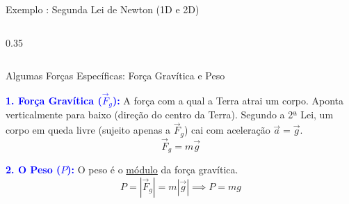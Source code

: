 \documentclass{beamer}
\begin{document}
\begin{frame}{Exemplo : Segunda Lei de Newton (1D e 2D)}
\begin{columns}[T]
\begin{column}{0.35\textwidth}
			\end{column}
		\end{columns}
		
	\end{frame}
	
	
	
	\begin{frame}{Algumas Forças Específicas: Força Gravítica e Peso}
		\footnotesize
		
		\textcolor{blue}{\textbf{1. Força Gravítica ($\vec{F}_g$):}} 		A força com a qual a Terra atrai um corpo. Aponta verticalmente para baixo (direção do centro da Terra).
		Segundo a 2ª Lei, um corpo em queda livre (sujeito apenas a $\vec{F}_g$) cai com aceleração $\vec{a} = \vec{g}$.
		\begin{equation*}
			\vec{F}_g = m\vec{g}
		\end{equation*}

		\textcolor{blue}{\textbf{2. O Peso ($P$):}} O peso é o \underline{módulo} da força gravítica. 
		\begin{equation*}
			P = |\vec{F}_g| = m |\vec{g}| \implies P = mg
		\end{equation*}
		

		
		
	\end{frame}
	
\end{document}
